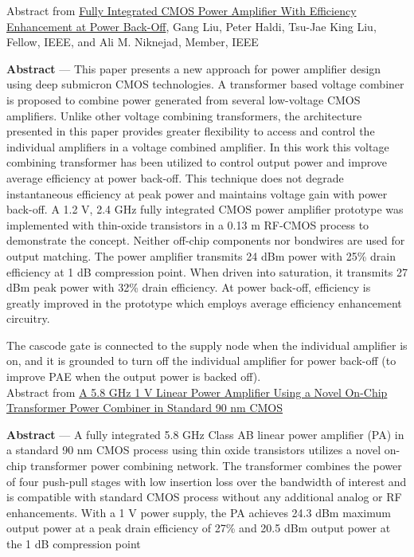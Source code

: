 \documentclass{article}
\begin{document}
Abstract from \href{https://ieeexplore.ieee.org/document/4456783}{Fully Integrated CMOS Power Amplifier With Efficiency Enhancement at Power Back-Off}, Gang Liu, Peter Haldi, Tsu-Jae King Liu, Fellow, IEEE, and Ali M. Niknejad, Member, IEEE

\begin{info}
	\textbf{Abstract} — This paper presents a new approach for power amplifier design using deep submicron CMOS technologies. A transformer based voltage combiner is proposed to combine power generated from several low-voltage CMOS amplifiers. Unlike other voltage combining transformers, the architecture presented in this paper provides greater flexibility to access and control the individual amplifiers in a voltage combined amplifier. In this work this voltage combining transformer has been utilized to control output power and improve average efficiency at power back-off. This technique does not degrade instantaneous efficiency at peak power and maintains voltage gain with power back-off. A 1.2 V, 2.4 GHz fully integrated CMOS power amplifier prototype was implemented with thin-oxide transistors in a 0.13 m RF-CMOS process to demonstrate the concept. Neither off-chip components nor bondwires are used for output matching. The power amplifier transmits 24 dBm power with 25\% drain efficiency at 1 dB compression point. When driven into saturation, it transmits 27 dBm peak power with 32\% drain efficiency. At power back-off, efficiency is greatly improved in the prototype which employs average efficiency enhancement circuitry.
\end{info}



The cascode gate is connected to the supply node when the individual amplifier is on, and it is grounded to turn off the individual amplifier for power back-off (to improve PAE when the output power is backed off).\\


Abstract from \href{https://ieeexplore.ieee.org/document/4494655}{A 5.8 GHz 1 V Linear Power Amplifier Using a Novel On-Chip Transformer Power Combiner in Standard 90 nm CMOS}

\begin{info}
	\textbf{Abstract} — A fully integrated 5.8 GHz Class AB linear power amplifier (PA) in a standard 90 nm CMOS process using thin oxide transistors utilizes a novel on-chip transformer power combining network. The transformer combines the power of four push-pull stages with low insertion loss over the bandwidth of interest and is compatible with standard CMOS process without any additional analog or RF enhancements. With a 1 V power supply, the PA achieves 24.3 dBm maximum output power at a peak drain efficiency of 27\% and 20.5 dBm output power at the 1 dB compression point
\end{info}
\end{document}
